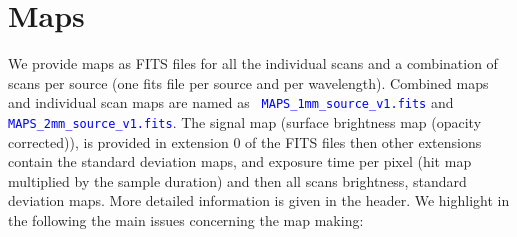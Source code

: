 \documentclass[a4paper,10pt]{article}
\begin{document}
\section{Maps}\label{sec:maps}
We provide maps as FITS files for all the individual scans and a combination
of scans per source (one fits file per source and per wavelength). Combined
maps and individual scan maps are named as \textcolor{blue}{{\tt
    MAPS\_1mm\_source\_v1.fits}} and \textcolor{blue}{{\tt
    MAPS\_2mm\_source\_v1.fits}}.  The signal map (surface brightness map
(opacity corrected)), is provided in extension 0 of the FITS files then other
extensions contain the standard deviation maps, and exposure time per pixel
(hit map multiplied by the sample duration) and then all scans brightness,
standard deviation maps.  More detailed information is given in the header. We
highlight in the following the main issues concerning the map making:
\end{document}

